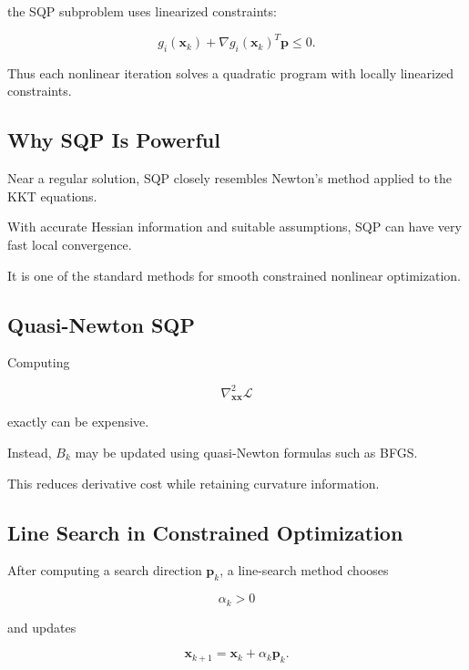 the SQP subproblem uses linearized constraints:

\[
\boxed{
g_i(\mathbf{x}_k)
+
\nabla g_i(\mathbf{x}_k)^T\mathbf{p}
\leq0.
}
\]

Thus each nonlinear iteration solves a quadratic program with locally
linearized constraints.

\subsection{Why SQP Is Powerful}
\label{subsec:why-sqp}

Near a regular solution, SQP closely resembles Newton's method applied to
the KKT equations.

With accurate Hessian information and suitable assumptions, SQP can have
very fast local convergence.

It is one of the standard methods for smooth constrained nonlinear
optimization.

\subsection{Quasi-Newton SQP}
\label{subsec:quasi-newton-sqp}

Computing

\[
\nabla_{\mathbf{x}\mathbf{x}}^2
\mathcal{L}
\]

exactly can be expensive.

Instead, \(B_k\) may be updated using quasi-Newton formulas such as BFGS.

This reduces derivative cost while retaining curvature information.

\subsection{Line Search in Constrained Optimization}
\label{subsec:nlp-line-search}

After computing a search direction \(\mathbf{p}_k\), a line-search method
chooses

\[
\alpha_k>0
\]

and updates

\[
\boxed{
\mathbf{x}_{k+1}
=
\mathbf{x}_k
+
\alpha_k\mathbf{p}_k.
}
\]

